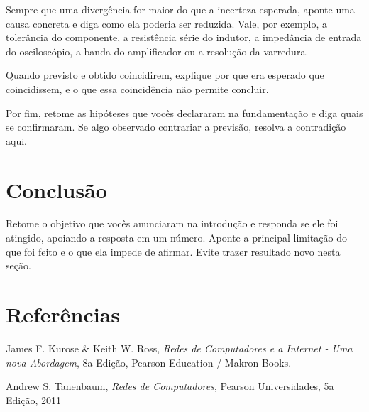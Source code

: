 \documentclass[11pt,a4paper]{article}
\begin{document}
Sempre que uma divergência for maior do que a incerteza esperada, aponte uma causa concreta
e diga como ela poderia ser reduzida. Vale, por exemplo, a tolerância do componente, a
resistência série do indutor, a impedância de entrada do osciloscópio, a banda do
amplificador ou a resolução da varredura.

Quando previsto e obtido coincidirem, explique por que era esperado que coincidissem, e o
que essa coincidência não permite concluir.

Por fim, retome as hipóteses que vocês declararam na fundamentação e diga quais se
confirmaram. Se algo observado contrariar a previsão, resolva a contradição aqui.

\section{Conclusão}

Retome o objetivo que vocês anunciaram na introdução e responda se ele foi atingido,
apoiando a resposta em um número. Aponte a principal limitação do que foi feito e o que
ela impede de afirmar. Evite trazer resultado novo nesta seção.

\section{Referências}

\begin{referencias}
\item James F. Kurose \& Keith W. Ross, \emph{Redes de Computadores e a Internet - Uma nova Abordagem}, 8a Edição, Pearson Education / Makron Books.

\item Andrew S. Tanenbaum, \emph{Redes de Computadores}, Pearson Universidades, 5a Edição, 2011
\end{referencias}
\end{document}
